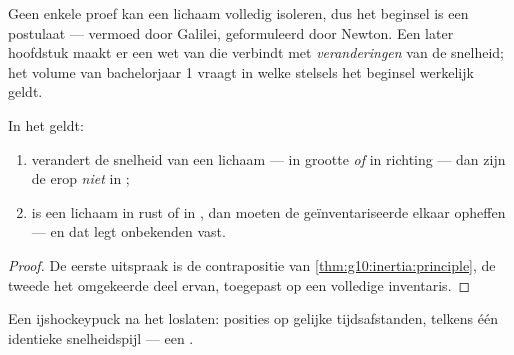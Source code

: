 \begin{remark}
Geen enkele proef kan een lichaam volledig isoleren, dus het beginsel is
een postulaat --- vermoed door Galilei, geformuleerd door Newton. Een
later hoofdstuk maakt er een wet van die  verbindt met
\emph{veranderingen} van de snelheid; het volume van bachelorjaar 1
vraagt in welke stelsels het beginsel werkelijk geldt.
\end{remark}

\begin{proposition}\label{prop:g10:inertia:converse}
In het  geldt:
\begin{enumerate}
  \item verandert de snelheid van een lichaam --- in grootte \emph{of} in
        richting --- dan zijn de  erop \emph{niet} in ;
  \item is een lichaam in rust of in , dan
        moeten de geïnventariseerde  elkaar opheffen --- en dat
        legt onbekenden vast.
\end{enumerate}
\end{proposition}

\begin{proof}
De eerste uitspraak is de contrapositie van
\cref{thm:g10:inertia:principle}, de tweede het omgekeerde deel ervan,
toegepast op een volledige inventaris.
\end{proof}

\begin{omfigure}

{\small Een ijshockeypuck na het loslaten: posities op gelijke
tijdsafstanden, telkens één identieke snelheidspijl --- een .}
\end{omfigure}

